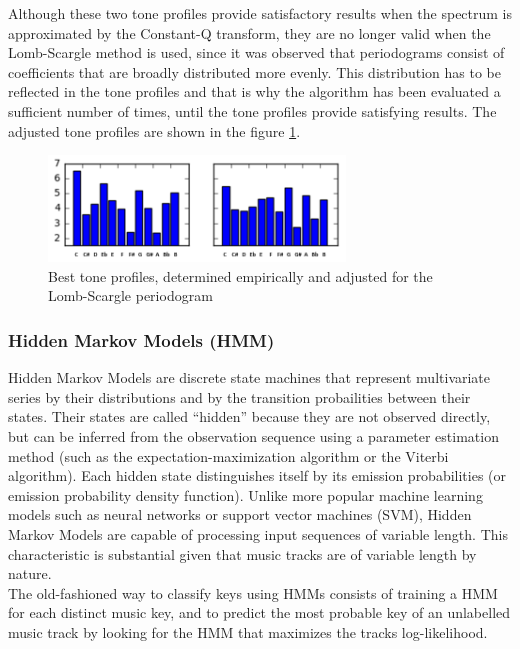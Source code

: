 \documentclass[letterpaper]{article}
\begin{document}
Although these two tone profiles provide satisfactory results when the spectrum is approximated by the Constant-Q transform, they are no longer valid 
when the Lomb-Scargle method is used, since it was observed that periodograms consist of coefficients that are broadly distributed more evenly. This distribution has to be reflected in the tone profiles and that is why the algorithm has been evaluated a sufficient number of times, until the tone profiles
provide satisfying results. The adjusted tone profiles are shown in the figure \ref{profiles}.

\begin{figure}
\begin{center}
\includegraphics[width=3.1in,angle=0]{imgs/Custom.png}
\caption{Best tone profiles, determined empirically and adjusted for the Lomb-Scargle periodogram}
\label{profiles}
\end{center}
\end{figure}

\subsubsection{Hidden Markov Models (HMM)}
\label{sssec:hmm}

Hidden Markov Models are discrete state machines that represent multivariate series by their distributions and by
the transition probailities between their states. Their states are called “hidden” because they are not observed directly,
but can be inferred from the observation sequence using a parameter estimation method (such as the expectation-maximization algorithm
or the Viterbi algorithm). Each hidden state distinguishes itself by its emission probabilities (or emission probability density function).
Unlike more popular machine learning models such as neural networks or support vector machines (SVM), Hidden Markov Models are capable of
processing input sequences of variable length. This characteristic is substantial given that music tracks are of variable length by nature.\\

The old-fashioned way to classify keys using HMMs consists of training a HMM for each distinct music key, and to predict the most probable 
key of an unlabelled music track by looking for the HMM that maximizes the track\textquotesingle s log-likelihood.
\end{document}
